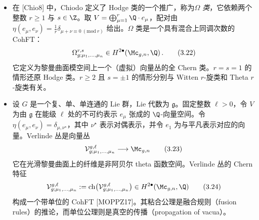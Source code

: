 \begin{example}[3.2]
\begin{itemize}
  \item 在 [Chio8] 中，Chiodo 定义了 Hodge 类的一个推广，称为\emph{$\Omega$ 类}，它依赖两个整数 $r\ge 1$ 与 $s\in\Z$。取 $V=\bigoplus_{\mu=1}^{r}\Q\cdot e_{\mu}$，配对由 $\eta(e_{\mu},e_{\nu})=\frac{1}{r}\delta_{\mu+\nu\equiv 0\ (\mathrm{mod}\ r)}$ 给出。$\Omega$ 类是一个具有混合上同调次数的 CohFT：
  \begin{equation}
    \Omega^{r,s}_{g;\mu_{1},\dots,\mu_{n}}\in H^{2\bullet}(\Mc_{g,n},\Q)\,.
    \tag{3.22}
  \end{equation}
  它定义为黎曼曲面模空间上一个（虚拟）向量丛的全 Chern 类。$r=s=1$ 的情形还原 Hodge 类。$r\ge 2$ 且 $s=\pm1$ 的情形分别与 Witten $r$-旋类和 Theta $r$-旋类有关。
  \item 设 $G$ 是一个复、单、单连通的 Lie 群，Lie 代数为 $\mathfrak{g}$。固定整数 $\ell>0$，令 $V$ 为由 $\mathfrak{g}$ 在能级 $\ell$ 处的不可约表示 $e_{\mu}$ 张成的 $\Q$-向量空间。令 $\eta(e_{\mu},e_{\nu})=\delta_{\mu,\nu^{\star}}$，其中 $\nu^{\star}$ 表示对偶表示，并令 $e_{1}$ 为与平凡表示对应的向量。Verlinde 丛是向量丛
  \begin{equation}
    \mathcal{V}^{g,\ell}_{g;\mu_{1},\dots,\mu_{n}}\longrightarrow\Mc_{g,n}
    \tag{3.23}
  \end{equation}
  它在光滑黎曼曲面上的纤维是非阿贝尔 theta 函数空间。Verlinde 丛的 Chern 特征
  \begin{equation}
    \mathcal{V}^{g,\ell}_{g;\mu_{1},\dots,\mu_{n}}:=\mathrm{ch}\big(\mathcal{V}^{g,\ell}_{g;\mu_{1},\dots,\mu_{n}}\big)\in H^{2\bullet}(\Mc_{g,n},\Q)
    \tag{3.24}
  \end{equation}
  构成一个带单位的 CohFT [MOPPZ17]。其粘合公理是融合规则（fusion rules）的推论，而单位公理则是真空的传播（propagation of vacua）。
\end{itemize}
\end{example}

